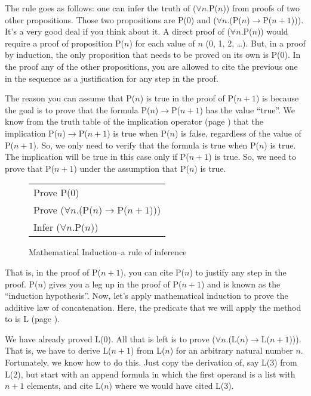 The rule goes as follows: one can infer the truth of ($\forall$$n$.P($n$)) 
from proofs of two other propositions. 
Those two propositions are P(0) and ($\forall$$n$.(P($n$)$\rightarrow$P($n+1$))). 
It's a very good deal if you think about it. 
A direct proof of ($\forall$$n$.P($n$)) would require a proof of proposition P($n$) 
for each value of $n$ (0, 1, 2, \dots). 
But, in a proof by induction, the only proposition that needs to be proved on its own is P(0). 
In the proof any of the other propositions, 
you are allowed to cite the previous one in the sequence as a justification for any step in the proof.

The reason you can assume that P($n$) is true in the proof of P($n+1$) 
is because the goal is to prove that the formula 
P($n$)$\rightarrow$P($n+1$) has the value ``true''. 
We know from the truth table of the implication operator 
(page \pageref{implication-truth-table}) that the implication
P($n$)$\rightarrow$P($n+1$) is true when P($n$) is false,
regardless of the value of P($n+1$).
So, we only need to verify that the formula is true when P($n$) is true. 
The implication will be true in this case only if P($n+1$) is true. 
So, we need to prove that P($n+1$) under the assumption that P($n$) is true.
\begin{figure}
\begin{center}
\begin{tabular}{l}
Prove P(0) \\
Prove ($\forall$$n$.(P($n$)$\rightarrow$P($n+1$))) \\
\hline
Infer ($\forall$$n$.P($n$))
\end{tabular}
\end{center}
\caption{Mathematical Induction--a rule of inference}
\label{fig-04-01}
\end{figure}

That is, in the proof of P($n+1$), you can cite P($n$) to justify any step in the proof. 
\label{induction-hyp-def}
P($n$) gives you a leg up in the proof of P($n+1$) and is known as the ``induction hypothesis''.
Now, let's apply mathematical induction to prove 
the additive law of concatenation. 
Here, the predicate that we will apply the method to is L (page \pageref{additive-concat-law-predicate}).

\label{len-additive-thm}
We have already proved L(0). 
All that is left is to prove ($\forall$$n$.(L($n$)$\rightarrow$L($n+1$))). 
That is, we have to derive L($n+1$) from L($n$) for an arbitrary natural number $n$. 
Fortunately, we know how to do this. Just copy the derivation of, 
say L(3) from L(2), but start with an append formula in which the first operand 
is a list with $n+1$ elements, and cite L($n$) where we would have cited L(3).

